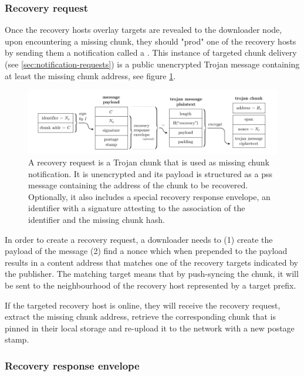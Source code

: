 \subsubsection{Recovery request}

Once the recovery hosts overlay targets are revealed to the downloader node, upon encountering a missing chunk, they should "prod" one of the recovery hosts by sending them a notification called a . This instance of targeted chunk delivery (see \ref{sec:notification-requests}) is a public unencrypted Trojan message containing at least the missing chunk address, see figure \ref{fig:recovery-request}.

\begin{figure}[htbp]
  \centering
  \includegraphics[width=\textwidth]{fig/recovery-request.pdf}
  \caption[Recovery request \statusgreen]{A recovery request is a Trojan chunk that is used as missing chunk notification. It is unencrypted and its payload is structured as a pss message containing the address of the chunk to be recovered. Optionally, it also includes a special recovery response envelope, an identifier with a signature attesting to the association of the identifier and the missing chunk hash.}
  \label{fig:recovery-request}
\end{figure}

In order to create a recovery request, a downloader needs to (1) create the payload of the message (2) find a nonce which when prepended to the payload results in a content address that matches one of the recovery targets indicated by the publisher. The matching target means that by push-syncing the chunk, it will be sent to the neighbourhood of the recovery host represented by a target prefix. 

If the targeted recovery host is online, they will receive the recovery request, extract the missing chunk address, retrieve the corresponding chunk that is pinned in their local storage and re-upload it to the network with a new postage stamp.

\subsubsection{Recovery response envelope}

